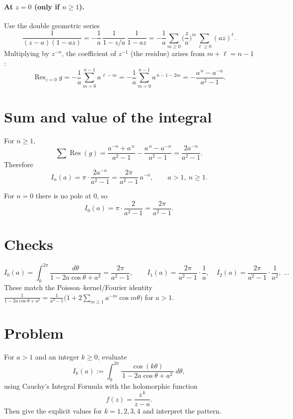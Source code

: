 \documentclass[11pt]{article}
\DeclareMathOperator{\Res}{Res}
\begin{document}
\paragraph{At $z=0$ (only if $n\ge1$).}
Use the double geometric series
\[
\frac{1}{(z-a)(1-az)}
=-\frac1a\,\frac{1}{1-z/a}\,\frac{1}{1-az}
=-\frac1a\sum_{m\ge0}\Big(\frac{z}{a}\Big)^m\sum_{\ell\ge0}(az)^\ell .
\]
Multiplying by $z^{-n}$, the coefficient of $z^{-1}$ (the residue) arises from
$m+\ell=n-1$:
\[
\Res_{z=0} g
=-\frac1a\sum_{m=0}^{n-1}a^{\,\ell-m}
=-\frac1a\sum_{m=0}^{n-1}a^{\,n-1-2m}
=-\frac{a^{\,n}-a^{-n}}{a^2-1}.
\]

\section*{Sum and value of the integral}
For $n\ge1$,
\[
\sum \Res(g)=\frac{a^{-n}+a^{\,n}}{a^2-1}-\frac{a^{\,n}-a^{-n}}{a^2-1}
=\frac{2a^{-n}}{a^2-1}.
\]
Therefore
\[
\boxed{\ I_n(a)=\pi\cdot\frac{2a^{-n}}{a^2-1}
	=\frac{2\pi}{a^2-1}\,a^{-n},\qquad a>1,\ n\ge1.\ }
\]

For $n=0$ there is no pole at $0$, so
\[
\boxed{\ I_0(a)=\pi\cdot\frac{2}{a^2-1}=\frac{2\pi}{a^2-1}. \ }
\]

\section*{Checks}
\[
I_0(a)=\int_0^{2\pi}\frac{d\theta}{1-2a\cos\theta+a^2}
=\frac{2\pi}{a^2-1},\qquad
I_1(a)=\frac{2\pi}{a^2-1}\cdot\frac1a,\quad
I_2(a)=\frac{2\pi}{a^2-1}\cdot\frac1{a^2},\ \ldots
\]
These match the Poisson–kernel/Fourier identity
\(
\displaystyle \frac{1}{1-2a\cos\theta+a^2}
=\frac{1}{a^2-1}\Big(1+2\sum_{m\ge1}a^{-m}\cos m\theta\Big)
\)
for $a>1$.

\section*{Problem}
For $a>1$ and an integer $k\ge 0$, evaluate
\[
I_k(a):=\int_{0}^{2\pi}\frac{\cos(k\theta)}{\,1-2a\cos\theta+a^2\,}\,d\theta,
\]
using Cauchy’s Integral Formula with the holomorphic function
\[
f(z)=\frac{z^{\,k}}{z-a}.
\]
Then give the explicit values for $k=1,2,3,4$ and interpret the pattern.
\end{document}
